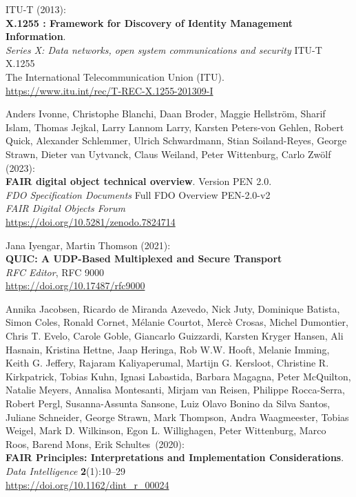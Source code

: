 \begin{thebibliography}{9}
ITU-T (2013): \\
\textbf{X.1255 : Framework for Discovery of Identity Management Information}.\\
\emph{Series X: Data networks, open system communications and security} ITU-T X.1255 \\
The International Telecommunication Union (ITU).\\
\url{https://www.itu.int/rec/T-REC-X.1255-201309-I}

Anders Ivonne, Christophe Blanchi, Daan Broder, Maggie Hellström, Sharif Islam, Thomas Jejkal, Larry Lannom Larry, Karsten Peters-von Gehlen, Robert Quick,
Alexander Schlemmer, Ulrich Schwardmann, Stian Soiland-Reyes,
George Strawn, Dieter van Uytvanck, Claus Weiland, Peter Wittenburg,
Carlo Zwölf (2023): \\
\textbf{{FAIR} digital object technical overview}. Version PEN 2.0.\\
\emph{FDO Specification Documents} Full FDO Overview PEN-2.0-v2 \\
\emph{FAIR Digital Objects Forum}\\
\url{https://doi.org/10.5281/zenodo.7824714}

Jana Iyengar, Martin Thomson (2021): \\
\textbf{{QUIC}: {A UDP-Based Multiplexed} and {Secure Transport}}\\
\emph{RFC Editor}, RFC 9000\\
\url{https://doi.org/10.17487/rfc9000}


Annika Jacobsen, Ricardo de Miranda Azevedo, Nick Juty, Dominique Batista, Simon Coles, Ronald Cornet, Mélanie Courtot, Mercè Crosas, Michel Dumontier, Chris T. Evelo, Carole Goble, Giancarlo Guizzardi, Karsten Kryger Hansen, Ali Hasnain, Kristina Hettne, Jaap Heringa, Rob W.W. Hooft, Melanie Imming, Keith G. Jeffery, Rajaram Kaliyaperumal, Martijn G. Kersloot, Christine R. Kirkpatrick, Tobias Kuhn, Ignasi Labastida, Barbara Magagna, Peter McQuilton, Natalie Meyers, Annalisa Montesanti, Mirjam van Reisen, Philippe Rocca-Serra, Robert Pergl, Susanna-Assunta Sansone, Luiz Olavo Bonino da Silva Santos, Juliane Schneider, George Strawn, Mark Thompson, Andra Waagmeester, Tobias Weigel, Mark D. Wilkinson, Egon L. Willighagen, Peter Wittenburg, Marco Roos, Barend Mons, Erik Schultes~(2020):\\
\textbf{FAIR Principles: Interpretations and Implementation
Considerations}.\\
\emph{Data Intelligence} \textbf{2}(1):10--29\\
\url{https://doi.org/10.1162/dint_r_00024}


\end{thebibliography}
